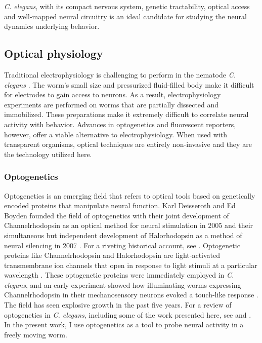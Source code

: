 \textit{C. elegans}, with its compact nervous system, genetic tractability,  optical access and well-mapped neural circuitry is an ideal candidate for studying the neural dynamics underlying behavior.

\subsection{Optical physiology}
Traditional electrophysiology is challenging to perform in the nematode \textit{C. elegans} \citep{goodman_active_1998, schafer_neurophysiological_2006}. The worm's small size and pressurized fluid-filled body make it difficult for electrodes to gain access to neurons.  As a result, electrophysiology experiments are  performed on worms that are partially dissected and immobilized. These preparations make it extremely difficult to correlate neural activity with behavior.  Advances in optogenetics and fluorescent reporters, however,  offer a viable alternative to electrophysiology. When used with transparent organisms, optical techniques are entirely non-invasive and they are the technology utilized here. 

\subsubsection{Optogenetics}
Optogenetics is an emerging field that refers to optical tools based on genetically encoded proteins that manipulate neural function. Karl Deisseroth and Ed Boyden founded the field of optogenetics with their joint development of Channelrhodopsin as an optical method for neural stimulation in  2005 \citep{boyden_millisecond-timescale_2005} and their simultaneous but independent development of Halorhodopsin as a method of neural silencing in 2007 \citep{zhang_multimodal_2007, han_multiple-color_2007}.  For a riveting historical account, see \citep{boyden_history_2011}. Optogenetic proteins like Channelrhodopsin and Halorhodopsin are light-activated transmembrane ion channels that open in response to light stimuli at a particular wavelength \citep{nagel_channelrhodopsin-2_2003, yizhar_optogenetics_2011, fenno_development_2011}. These optogenetic proteins were immediately employed  in \textit{C. elegans}, and an early experiment showed how illuminating worms expressing Channelrhodopsin in their mechanosensory neurons evoked a touch-like response  \citep{nagel_light_2005}.  The field has seen explosive growth in the past five years. For a review of optogenetics in \textit{C. elegans}, including some of the work presented here, see \citep{xu_early_2011} and \citep{yizhar_optogenetics_2011}. In the present work, I use optogenetics as a tool to probe neural activity in a freely moving worm. 

